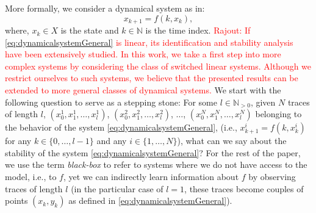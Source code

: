 More formally, we consider a dynamical system as in:
\vspace{-0.88394mm}
\begin{equation}\label{eq:dynamicalsystemGeneral}
x_{k+1} = f(k, x_k),
\end{equation}
where, $x_k \in X$ is the state and $k \in \mathbb{N}$ is the time index. 
\textcolor{red}{Rajout: If \eqref{eq:dynamicalsystemGeneral} is linear, its identification and stability analysis have been extensively studied. In this work, we take a first step into more complex systems by considering the class of switched linear systems. Although we restrict ourselves to such systems, we believe that the presented results can be extended to more general classes of dynamical systems.} 
We start with the following question to serve as a stepping stone: For some $l \in \mathbb{N}_{>0}$, given $N$ traces of length $l$, $(x_0^1,x_1^1,\dots, x_l^1)$, $(x_0^2,x_1^2,\dots, x_l^2)$, $\ldots$, $(x_0^N,x_1^N,\dots,x_l^N)$ belonging to the behavior of the system \eqref{eq:dynamicalsystemGeneral}, (i.e., $x_{k+1}^i = f(k, x_k^i)$ for any $k \in \{0,\dots,l-1\}$ and any $i \in \{1,\dots,N\}$), what can we say about the stability of the system \eqref{eq:dynamicalsystemGeneral}? For the rest of the paper, we use the term \emph{black-box} to refer to systems where we do not have access to the model, i.e., to $f$, yet we can indirectly learn information about $f$ by observing traces of length $l$ (in the particular case of $l=1$, these traces become couples of points $(x_k, y_k)$ as defined in \eqref{eq:dynamicalsystemGeneral}).

